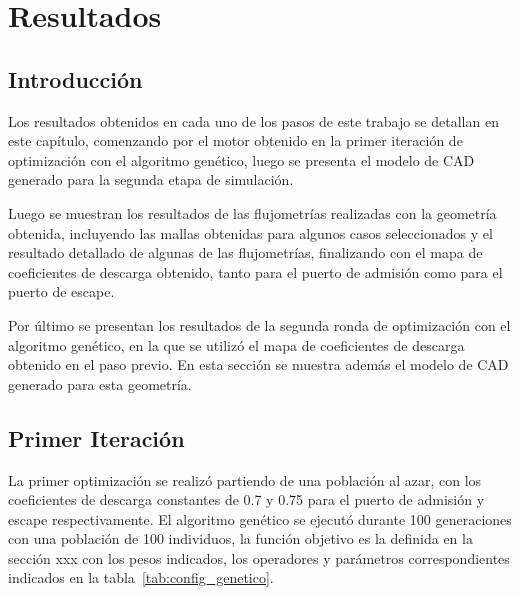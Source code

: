 \chapter{Resultados}

\section{Introducción}
%
Los resultados obtenidos en cada uno de los pasos de este trabajo se detallan en
este capítulo, comenzando por el motor obtenido en la primer iteración de
optimización con el algoritmo genético, luego se presenta el modelo de CAD
generado para la segunda etapa de simulación.

Luego se muestran los resultados de las flujometrías realizadas con la geometría
obtenida, incluyendo las mallas obtenidas para algunos casos seleccionados y el
resultado detallado de algunas de las flujometrías, finalizando con el mapa de
coeficientes de descarga obtenido, tanto para el puerto de admisión como para el
puerto de escape.

Por último se presentan los resultados de la segunda ronda de optimización con
el algoritmo genético, en la que se utilizó el mapa de coeficientes de descarga
obtenido en el paso previo.
%
En esta sección se muestra además el modelo de CAD generado para esta geometría.

\section{Primer Iteración}
%
La primer optimización se realizó partiendo de una población al azar, con los
coeficientes de descarga constantes de 0.7 y 0.75 para el puerto de admisión y
escape respectivamente.
%
El algoritmo genético se ejecutó durante 100 generaciones con una población de
100 individuos, la función objetivo es la definida en la sección xxx con los
pesos indicados, los operadores y parámetros correspondientes indicados en la
tabla~\ref{tab:config_genetico}.

